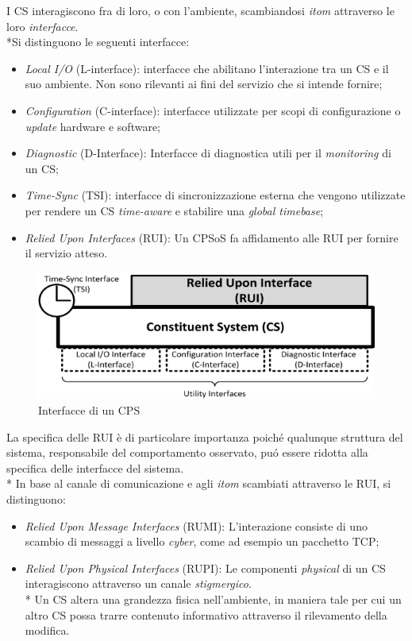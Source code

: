 I CS interagiscono fra di loro, o con l'ambiente, scambiandosi \emph{itom} attraverso le loro \emph{interfacce}.\\*Si distinguono le seguenti interfacce:
\begin{itemize}
	\item \emph{Local I/O} (L-interface): interfacce che abilitano l'interazione tra un CS e il suo ambiente. Non sono rilevanti ai fini del servizio che si intende fornire;
	\item \emph{Configuration} (C-interface): interfacce utilizzate per scopi di configurazione o \emph{update} hardware e software;
	\item \emph{Diagnostic} (D-Interface): Interfacce di diagnostica utili per il \emph{monitoring} di un CS;
	\item \emph{Time-Sync} (TSI): interfacce di sincronizzazione esterna che vengono utilizzate per rendere un CS \emph{time-aware} e stabilire una \emph{global timebase};
	\item \emph{Relied Upon Interfaces} (RUI): Un CPSoS fa affidamento alle RUI per fornire il servizio atteso.
\end{itemize}
\begin{figure}[h]
	\centering
	\includegraphics[width=0.7\linewidth]{img/csifaces}
	\caption{Interfacce di un CPS}
	\label{fig:csifaces}
\end{figure}
La specifica delle RUI \`e di particolare importanza poich\'e qualunque struttura del sistema, responsabile del comportamento osservato, pu\'o essere ridotta alla specifica delle interfacce del sistema. \cite{interfacespec}\\*
In base al canale di comunicazione e agli \emph{itom} scambiati attraverso le RUI, si distinguono:
\begin{itemize}
	\item \emph{Relied Upon Message Interfaces} (RUMI): L'interazione consiste di uno scambio di messaggi a livello \emph{cyber}, come ad esempio un pacchetto TCP;
	\item \emph{Relied Upon Physical Interfaces} (RUPI): Le componenti \emph{physical} di un CS interagiscono attraverso un canale \emph{stigmergico}.\\*
	Un CS altera una grandezza fisica nell'ambiente, in maniera tale per cui un altro CS possa trarre contenuto informativo attraverso il rilevamento della modifica.
\end{itemize}
